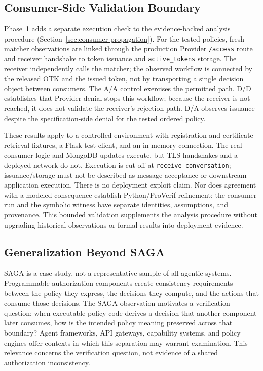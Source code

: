 
\subsection{Consumer-Side Validation Boundary}

Phase~1 adds a separate execution check to the evidence-backed analysis
procedure (Section~\ref{sec:consumer-propagation}). For the tested policies,
fresh matcher observations are linked through the production Provider
\texttt{/access} route and receiver handshake to token issuance and
\texttt{active\_tokens} storage. The receiver independently calls the
matcher; the observed workflow is connected by the released OTK and the
issued token, not by transporting a single decision object between consumers.
The A/A control exercises the permitted path. D/D establishes that Provider
denial stops this workflow; because the receiver is not reached, it does not
validate the receiver's rejection path. D/A observes issuance despite the
specification-side denial for the tested ordered policy.

These results apply to a controlled environment with registration and
certificate-retrieval fixtures, a Flask test client, and an in-memory
connection. The real consumer logic and MongoDB updates execute, but TLS
handshakes and a deployed network do not. Execution is cut off at
\texttt{receive\_conversation}; issuance/storage must not be described as
message acceptance or downstream application execution. There is no
deployment exploit claim. Nor does agreement with a modeled consequence
establish Python/ProVerif refinement: the consumer run and the symbolic
witness have separate identities, assumptions, and provenance. This
bounded validation supplements the analysis procedure without upgrading
historical observations or formal results into deployment evidence.

\subsection{Generalization Beyond SAGA}

SAGA is a case study, not a representative sample of all agentic systems.
Programmable authorization components create consistency requirements
between the policy they express, the decisions they compute, and the actions
that consume those decisions. The SAGA observation motivates a verification
question: when executable policy code derives a decision that another
component later consumes, how is the intended policy meaning preserved
across that boundary?
Agent frameworks, API gateways, capability systems, and policy engines offer
contexts in which this separation may warrant examination. This relevance
concerns the verification question, not evidence of a shared authorization
inconsistency.

